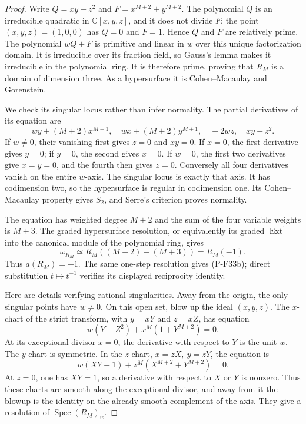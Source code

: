 \documentclass[11pt,a4paper]{article}
\begin{document}
\begin{proof}
Write $Q=xy-z^2$ and $F=x^{M+2}+y^{M+2}$.
The polynomial $Q$ is an irreducible quadratic in
$\mathbb C[x,y,z]$, and it does not divide $F$:
the point $(x,y,z)=(1,0,0)$ has $Q=0$ and $F=1$.
Hence $Q$ and $F$ are relatively prime. The polynomial
$wQ+F$ is primitive and linear in $w$ over this
unique factorization domain. It is irreducible over
its fraction field, so Gauss's lemma makes it
irreducible in the polynomial ring. It is therefore
prime, proving that $R_M$ is a domain of dimension three.
As a hypersurface it is Cohen--Macaulay and Gorenstein.

We check its singular locus rather than infer normality.
The partial derivatives of its equation are
\[
 wy+(M+2)x^{M+1},\quad
 wx+(M+2)y^{M+1},\quad -2wz,\quad xy-z^2.
 \tag{P-F33e}
\]
If $w\ne0$, their vanishing first gives $z=0$ and
$xy=0$. If $x=0$, the first derivative gives $y=0$;
if $y=0$, the second gives $x=0$.
If $w=0$, the first two derivatives give $x=y=0$,
and the fourth then gives $z=0$.
Conversely all four derivatives vanish on the entire
$w$-axis. The singular locus is exactly that axis.
It has codimension two, so the hypersurface is regular
in codimension one. Its Cohen--Macaulay property gives
$S_2$, and Serre's criterion proves normality.

The equation has weighted degree $M+2$ and the sum
of the four variable weights is $M+3$. The graded
hypersurface resolution, or equivalently its graded
$\operatorname{Ext}^1$ into the canonical module
of the polynomial ring, gives
\[
 \omega_{R_M}\simeq R_M((M+2)-(M+3))=R_M(-1).
 \tag{P-F33f}
\]
Thus $a(R_M)=-1$. The same one-step resolution
gives (P-F33b); direct substitution $t\mapsto t^{-1}$
verifies its displayed reciprocity identity.

Here are details verifying rational singularities.
Away from the origin, the only singular points
have $w\ne0$. On this open set, blow up the ideal
$(x,y,z)$. The $x$-chart of the strict transform,
with $y=xY$ and $z=xZ$, has equation
\[
 w(Y-Z^2)+x^M(1+Y^{M+2})=0.
 \tag{P-F33g}
\]
At its exceptional divisor $x=0$, the derivative
with respect to $Y$ is the unit $w$.
The $y$-chart is symmetric. In the $z$-chart,
$x=zX,\ y=zY$, the equation is
\[
 w(XY-1)+z^M(X^{M+2}+Y^{M+2})=0.
 \tag{P-F33h}
\]
At $z=0$, one has $XY=1$, so a derivative with
respect to $X$ or $Y$ is nonzero. Thus these charts
are smooth along the exceptional divisor, and
away from it the blowup is the identity on the
already smooth complement of the axis.
They give a resolution of $\operatorname{Spec}(R_M)_w$.


\end{proof}
\end{document}
